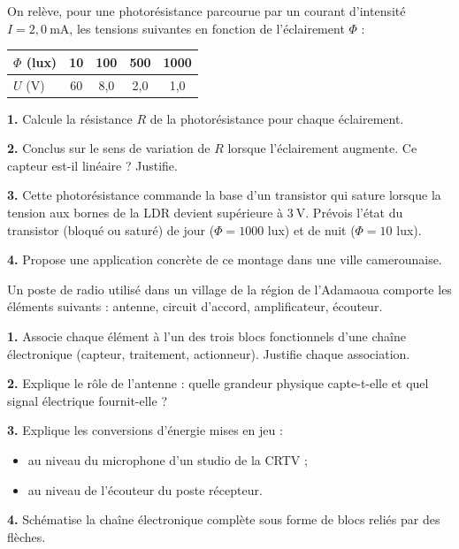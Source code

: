 \documentclass[11pt]{article}
\begin{document}
\begin{exercice}
On relève, pour une photorésistance parcourue par un courant d'intensité $I = 2{,}0~\text{mA}$, les tensions suivantes en fonction de l'éclairement $\Phi$ :

\begin{center}
\begin{tabular}{|l|c|c|c|c|}
\hline
\rowcolor{popblueL} $\Phi$ (lux) & 10 & 100 & 500 & 1000 \\
\hline
$U$ (V) & 60 & 8{,}0 & 2{,}0 & 1{,}0 \\
\hline
\end{tabular}
\end{center}

\textbf{1.} Calcule la résistance $R$ de la photorésistance pour chaque éclairement.

\textbf{2.} Conclus sur le sens de variation de $R$ lorsque l'éclairement augmente. Ce capteur est-il linéaire ? Justifie.

\textbf{3.} Cette photorésistance commande la base d'un transistor qui sature lorsque la tension aux bornes de la LDR devient supérieure à $3~\text{V}$. Prévois l'état du transistor (bloqué ou saturé) de jour ($\Phi = 1000$ lux) et de nuit ($\Phi = 10$ lux).

\textbf{4.} Propose une application concrète de ce montage dans une ville camerounaise.
\end{exercice}

\begin{exercice}
Un poste de radio utilisé dans un village de la région de l'Adamaoua comporte les éléments suivants : antenne, circuit d'accord, amplificateur, écouteur.

\textbf{1.} Associe chaque élément à l'un des trois blocs fonctionnels d'une chaîne électronique (capteur, traitement, actionneur). Justifie chaque association.

\textbf{2.} Explique le rôle de l'antenne : quelle grandeur physique capte-t-elle et quel signal électrique fournit-elle ?

\textbf{3.} Explique les conversions d'énergie mises en jeu :
\begin{itemize}
\item[a)] au niveau du microphone d'un studio de la CRTV ;
\item[b)] au niveau de l'écouteur du poste récepteur.
\end{itemize}

\textbf{4.} Schématise la chaîne électronique complète sous forme de blocs reliés par des flèches.
\end{exercice}
\end{document}
